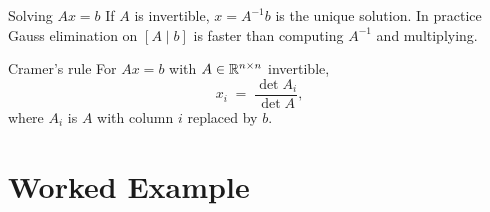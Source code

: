 \begin{rulebox}{Solving $A x = b$}
If $A$ is invertible, $x = A^{-1} b$ is the unique solution. In practice
Gauss elimination on $[A \mid b]$ is faster than computing $A^{-1}$ and
multiplying.
\end{rulebox}

\begin{rulebox}{Cramer's rule}
For $A x = b$ with $A \in \mathbb{R}^{n \times n}$ invertible,
\[
x_{i} \;=\; \frac{\det A_{i}}{\det A},
\]
where $A_{i}$ is $A$ with column $i$ replaced by $b$.
\end{rulebox}

\section{Worked Example}

